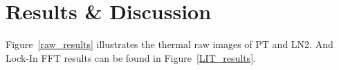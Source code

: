 \documentclass[]{spie}  %
\begin{document}
\section{Results \& Discussion} %
\label{sec:results_&_discussion}
Figure~\ref{raw_results} illustrates the thermal raw images of PT and LN2. And Lock-In FFT results can be found in Figure~\ref{LIT_results}.
\begin{figure}[ht]
   \centering
   \hspace{10pt}
   \hspace{10pt}
\end{figure}
\end{document}
